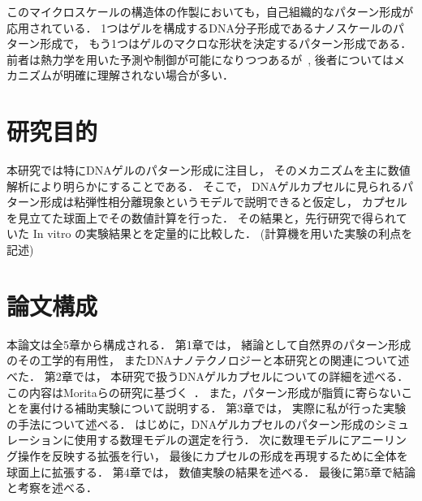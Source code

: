 このマイクロスケールの構造体の作製においても，自己組織的なパターン形成が応用されている．
1つはゲルを構成するDNA分子形成であるナノスケールのパターン形成で，
もう1つはゲルのマクロな形状を決定するパターン形成である．
前者は熱力学を用いた予測や制御が可能になりつつあるが~\cite{zadeh2011nupack}, 
後者についてはメカニズムが明確に理解されない場合が多い．


\section{研究目的}
本研究では特にDNAゲルのパターン形成に注目し，
そのメカニズムを主に数値解析により明らかにすることである．
そこで，
DNAゲルカプセルに見られるパターン形成は粘弾性相分離現象というモデルで説明できると仮定し，
カプセルを見立てた球面上でその数値計算を行った．
その結果と，先行研究で得られていた In vitro の実験結果とを定量的に比較した．
(計算機を用いた実験の利点を記述) %

\section{論文構成}
本論文は全5章から構成される．
第1章では，
緒論として自然界のパターン形成のその工学的有用性，
またDNAナノテクノロジーと本研究との関連について述べた．
第2章では，
本研究で扱うDNAゲルカプセルについての詳細を述べる．
この内容はMoritaらの研究に基づく~\cite{morita2017formation}．
また，パターン形成が脂質に寄らないことを裏付ける補助実験について説明する．
第3章では，
実際に私が行った実験の手法について述べる．
はじめに，DNAゲルカプセルのパターン形成のシミュレーションに使用する数理モデルの選定を行う．
次に数理モデルにアニーリング操作を反映する拡張を行い，
最後にカプセルの形成を再現するために全体を球面上に拡張する．
第4章では，
数値実験の結果を述べる．
最後に第5章で結論と考察を述べる．

